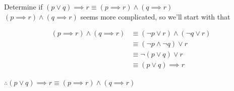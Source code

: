 \documentclass[../../Main.tex]{subfiles}
\begin{document}
\begin{example}
    Determine if $(p \lor q) \implies r \equiv (p \implies r) \land (q \implies r)$
    \\
    $(p \implies r) \land (q \implies r)$ seems more complicated, so we'll start with that
    
    \begin{align*}
        (p \implies r) \land (q \implies r)
        &\equiv (\neg p \lor r) \land (\neg q \lor r) \tag{Convert Conditionals} \\
        &\equiv (\neg p \land \neg q) \lor r \tag{Un-Distribute} \\
        &\equiv \neg (p \lor q) \lor r \tag{DeMorgan's Law} \\
        &\equiv (p \lor q) \implies r \tag{Convert back to Conditional}
    \end{align*}

    $\therefore (p \lor q) \implies r \equiv (p \implies r) \land (q \implies r)$
\end{example}

\end{document}
